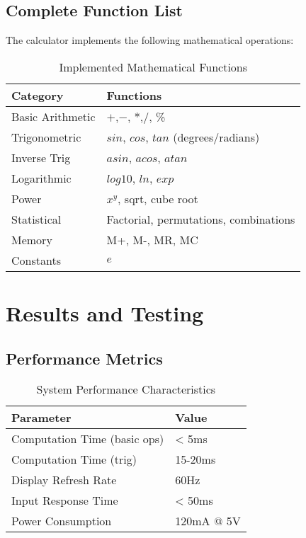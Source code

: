 \documentclass[journal]{IEEEtran}
\begin{document}
\subsection{Complete Function List}
The calculator implements the following mathematical operations:
\begin{table}[H]
\centering
\caption{Implemented Mathematical Functions}
\begin{tabularx}{\textwidth}{|l|X|}
\hline
\textbf{Category} & \textbf{Functions} \\ \hline
Basic Arithmetic & $+$,$ -$, $*$,$ /$, \% \\ \hline
Trigonometric & $sin$, $cos$, $tan$ (degrees/radians) \\ \hline
Inverse Trig & $asin$, $acos$, $atan$ \\ \hline
Logarithmic & $log10$, $ln$, $exp$ \\ \hline
Power & $x^y$, sqrt, cube root \\ \hline
Statistical & Factorial, permutations, combinations \\ \hline
Memory & M+, M-, MR, MC \\ \hline
Constants &  $e$ \\ \hline
\end{tabularx}
\end{table}

\section{Results and Testing}
\subsection{Performance Metrics}
\begin{table}[H]
\centering
\caption{System Performance Characteristics}
\begin{tabular}{|l|l|}
\hline
\textbf{Parameter} & \textbf{Value} \\ \hline
Computation Time (basic ops) & < 5ms \\ \hline
Computation Time (trig) & 15-20ms \\ \hline
Display Refresh Rate & 60Hz \\ \hline
Input Response Time & < 50ms \\ \hline
Power Consumption & 120mA @ 5V \\ \hline
\end{tabular}
\end{table}
\end{document}
